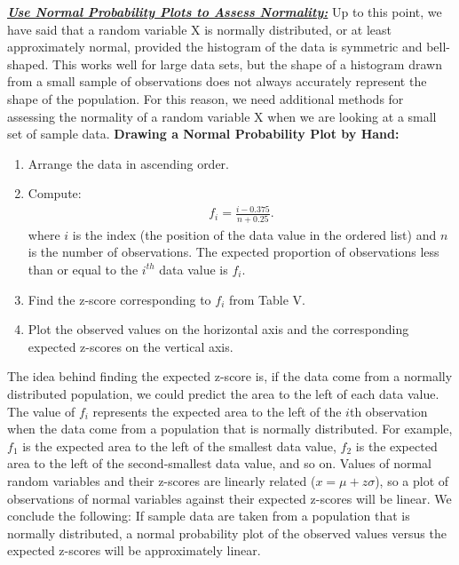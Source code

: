 \documentclass{report}
\begin{document}
  \pagebreak \bigbreak \noindent 
  \textbf{\textit{\underline{Use Normal Probability Plots to Assess Normality:}}}
  \bigbreak \noindent 
  Up to this point, we have said that a random variable X is normally distributed, or at least approximately normal, provided the histogram of the data is symmetric and bell-shaped. This works well for large data sets, but the shape of a histogram drawn from a small sample of observations does not always accurately represent the shape of the population. For this reason, we need additional methods for assessing the normality of a random variable X when we are looking at a small set of sample data.
  \bigbreak \noindent 
  \textbf{Drawing a Normal Probability Plot by Hand:}
  \begin{enumerate}
      \item Arrange the data in ascending order.
      \item Compute:
          \begin{align*}
             f_{i} = \frac{i-0.375}{n+0.25} 
          .\end{align*}
          where $i $ is the index (the position of the data value in the ordered list) and $n$ is the number of observations. The expected proportion of observations less than or equal to the $i^{th} $ data value is $f_{i}$.
      \item Find the z-score corresponding to $f_{i} $ from Table V.
    \item Plot the observed values on the horizontal axis and the corresponding expected z-scores on the vertical axis.
  \end{enumerate}
  \bigbreak \noindent 
  The idea behind finding the expected z-score is, if the data come from a normally distributed population, we could predict the area to the left of each data value. The value of $f_i$ represents the expected area to the left of the $i$th observation when the data come from a population that is normally distributed. For example, $f_1$ is the expected area to the left of the smallest data value, $f_2$ is the expected area to the left of the second-smallest data value, and so on.
  \bigbreak \noindent 
  Values of normal random variables and their z-scores are linearly related ($x = \mu + z\sigma$), so a plot of observations of normal variables against their expected z-scores will be linear. We conclude the following:
  \bigbreak \noindent 
    If sample data are taken from a population that is normally distributed, a normal probability plot of the observed values versus the expected z-scores will be approximately linear.
\end{document}
